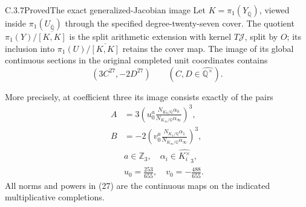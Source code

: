 \begin{result}{C.3.7}{Proved}{The exact generalized-Jacobian image}
\label{prop:ghost-genjac-image}
Let \(K=\pi_1(Y_{\overline{\mathbb Q}})\), viewed
inside \(\pi_1(U_{\overline{\mathbb Q}})\) through
the specified degree-twenty-seven cover. The quotient
\(\pi_1(Y)/\overline{[K,K]}\) is the split
arithmetic extension with kernel \(T\mathcal J\),
split by \(O\); its inclusion into
\(\pi_1(U)/\overline{[K,K]}\) retains the cover
map. The image of its global continuous sections in
the original completed unit coordinates contains
\[
           (3C^{27},-2D^{27})
       \qquad(C,D\in\widehat{\mathbb Q^\times}).       \tag{26}
\]

More precisely, at coefficient three its image consists
exactly of the pairs
\[
 \begin{split}
 A&=3\left(u_0^a\frac{N_{K_0/\mathbb Q}\alpha_0}
                           {N_{K_\infty/\mathbb Q}\alpha_\infty}
      \right)^3,\\
 B&=-2\left(v_0^a\frac{N_{K_1/\mathbb Q}\alpha_1}
                            {N_{K_\infty/\mathbb Q}\alpha_\infty}
      \right)^3,                                      \\
 &a\in\mathbb Z_3,\quad
 \alpha_i\in\widehat{K_i^\times}_3,\\
 &u_0=\frac{253}{655},\quad v_0=-\frac{488}{655}.
 \end{split}\tag{27}
\]
All norms and powers in (27) are the continuous maps
on the indicated multiplicative completions.
\end{result}
